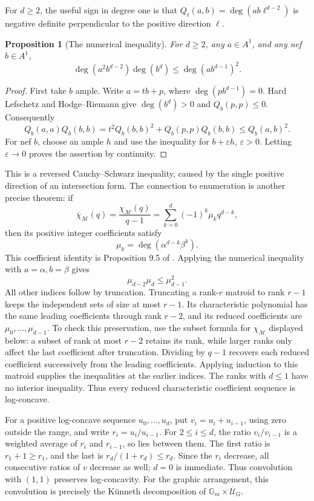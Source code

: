 \documentclass[11pt]{article}
\newtheorem{proposition}[theorem]{Proposition}
\theoremstyle{definition}
\theoremstyle{remark}
\begin{document}
For $d\ge2$, the useful sign in degree one is that $Q_\ell(a,b)=\deg(ab\ell^{d-2})$ is negative definite perpendicular to the positive direction $\ell$.

\begin{proposition}[The numerical inequality]\label{prop:gmh-hodge-index}
For $d\ge2$, any $a\in A^1$, and any nef $b\in A^1$,
\[
 \deg(a^2b^{d-2})\deg(b^d)
 \le\deg(ab^{d-1})^2.
\]
\end{proposition}
\begin{proof}
First take $b$ ample. Write $a=tb+p$, where $\deg(pb^{d-1})=0$. Hard Lefschetz and Hodge--Riemann give $\deg(b^d)>0$ and $Q_b(p,p)\le0$. Consequently
\[
 Q_b(a,a)Q_b(b,b)
 =t^2Q_b(b,b)^2+Q_b(p,p)Q_b(b,b)
 \le Q_b(a,b)^2.
\]
For nef $b$, choose an ample $h$ and use the inequality for $b+\varepsilon h$, $\varepsilon>0$. Letting $\varepsilon\to0$ proves the assertion by continuity.
\end{proof}

This is a reversed Cauchy--Schwarz inequality, caused by the single positive direction of an intersection form. The connection to enumeration is another precise theorem: if
\[
 \overline\chi_{\mathcal M}(q)
 =\frac{\chi_{\mathcal M}(q)}{q-1}
 =\sum_{k=0}^d(-1)^k\mu_kq^{d-k},
\]
then its positive integer coefficients satisfy
\begin{equation}\label{eq:gmh-coefficient-intersections}
 \mu_k=\deg(\alpha^{d-k}\beta^k).
\end{equation}
This coefficient identity is Proposition 9.5 of \cite{gmhAHK2018}. Applying the numerical inequality with $a=\alpha,b=\beta$ gives
\[
 \mu_{d-2}\mu_d\le\mu_{d-1}^2.
\]
All other indices follow by truncation. Truncating a rank-$r$ matroid to rank $r-1$ keeps the independent sets of size at most $r-1$. Its characteristic polynomial has the same leading coefficients through rank $r-2$, and its reduced coefficients are $\mu_0,\ldots,\mu_{d-1}$. To check this preservation, use the subset formula for $\chi_{\mathcal M}$ displayed below: a subset of rank at most $r-2$ retains its rank, while larger ranks only affect the last coefficient after truncation. Dividing by $q-1$ recovers each reduced coefficient successively from the leading coefficients. Applying induction to this matroid supplies the inequalities at the earlier indices. The ranks with $d\le1$ have no interior inequality. Thus every reduced characteristic coefficient sequence is log-concave.

For a positive log-concave sequence $u_0,\ldots,u_d$, put $v_i=u_i+u_{i-1}$, using zero outside the range, and write $r_i=u_i/u_{i-1}$. For $2\le i\le d$, the ratio $v_i/v_{i-1}$ is a weighted average of $r_i$ and $r_{i-1}$, so lies between them. The first ratio is $r_1+1\ge r_1$, and the last is $r_d/(1+r_d)\le r_d$. Since the $r_i$ decrease, all consecutive ratios of $v$ decrease as well; $d=0$ is immediate. Thus convolution with $(1,1)$ preserves log-concavity. For the graphic arrangement, this convolution is precisely the Künneth decomposition of $\mathbb G_m\times\overline{\mathcal U}_G$.
\end{document}
